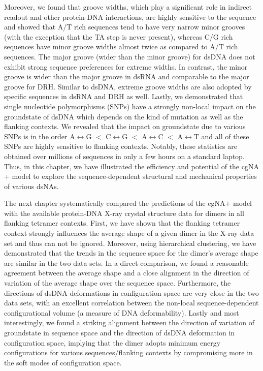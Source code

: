 Moreover, we found that groove widths, which play a significant role in indirect readout and other protein-DNA interactions, are highly sensitive to the sequence and showed that A/T rich sequences tend to have very narrow minor grooves (with the exception that the TA step is never present), whereas C/G rich sequences have minor groove widths almost twice as compared to A/T rich sequences.
The major groove (wider than the minor groove) for dsDNA does not exhibit strong sequence preferences for extreme widths.
In contrast, the minor groove is wider than the major groove in dsRNA and comparable to the major groove for DRH.
Similar to dsDNA, extreme groove widths are also adopted by specific sequences in dsRNA and DRH as well.
Lastly, we demonstrated that single nucleotide polymorphisms (SNPs) have a strongly non-local impact on the groundstate of dsDNA which depends on the kind of mutation as well as the flanking contexts. 
We revealed that the impact on groundstate due to various SNPs is in the order A$\longleftrightarrow$G $<$ C$\longleftrightarrow$G $<$ A$\longleftrightarrow$C $<$ A$\longleftrightarrow$T and all of these SNPs are highly sensitive to flanking contexts.
Notably, these statistics are obtained over millions of sequences in only a few hours on a standard laptop.
Thus, in this chapter, we have illustrated the efficiency and potential of the cgNA$+$ model to explore the sequence-dependent structural and mechanical properties of various dsNAs.

The next chapter systematically compared the predictions of the cgNA$+$ model with the available protein-DNA X-ray crystal structure data for dimers in all flanking tetramer contexts.
First, we have shown that the flanking tetramer context strongly influences the average shape of a given dimer in the X-ray data set and thus can not be ignored.
Moreover, using hierarchical clustering, we have demonstrated that the trends in the sequence space for the dimer's average shape are similar in the two data sets.
In a direct comparison, we found a reasonable agreement between the average shape and a close alignment in the direction of variation of the average shape over the sequence space.
Furthermore, the directions of dsDNA deformations in configuration space are very close in the two data sets, with an excellent correlation between the non-local sequence-dependent configurational volume (a measure of DNA deformability).
Lastly and most interestingly, we found a striking alignment between the direction of variation of groundstate in sequence space and the direction of dsDNA deformation in configuration space, implying that the dimer adopts minimum energy configurations for various sequences/flanking contexts by compromising more in the soft modes of configuration space.

